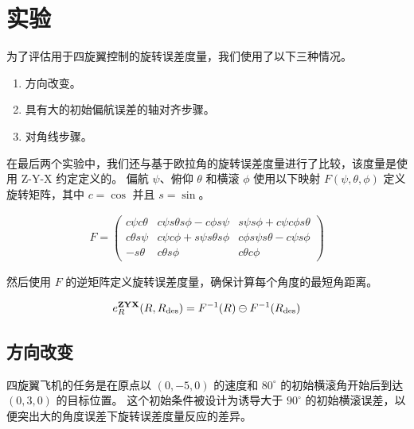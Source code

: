 \section{实验}

为了评估用于四旋翼控制的旋转误差度量，我们使用了以下三种情况。

\begin{enumerate}
  \item 方向改变。
  \item 具有大的初始偏航误差的轴对齐步骤。
  \item 对角线步骤。
\end{enumerate}

在最后两个实验中，我们还与基于欧拉角的旋转误差度量进行了比较，该度量是使用 Z-Y-X 约定定义的。
偏航 $\psi$、俯仰 $\theta$ 和横滚 $\phi$ 使用以下映射 $F(\psi, \theta, \phi)$ 定义旋转矩阵，其中 $c = \cos$ 并且 $s = \sin$。

\begin{align}
  F = \begin{pmatrix} c\psi c\theta & c\psi s\theta s\phi - c\phi s\psi & s\psi s \phi + c\psi c\phi s\theta \\
  c\theta s\psi & c\psi c\phi + s\psi s\theta s\phi & c\phi s\psi s\theta - c\psi s\phi \\
-s\theta & c\theta s\phi & c\theta c\phi \end{pmatrix}
\end{align}

然后使用 $F$ 的逆矩阵定义旋转误差度量，确保计算每个角度的最短角距离。

\begin{align}
  e_R^{\textbf{ZYX}}(R, R_{\text{des}}) = F^{-1}(R) \ominus F^{-1}(R_{\text{des}})
\end{align}

\subsection{方向改变}

四旋翼飞机的任务是在原点以 $(0, -5, 0)$ 的速度和 $80^\circ$ 的初始横滚角开始后到达 $(0, 3, 0)$ 的目标位置。
这个初始条件被设计为诱导大于 $90^\circ$ 的初始横滚误差，以便突出大的角度误差下旋转误差度量反应的差异。

